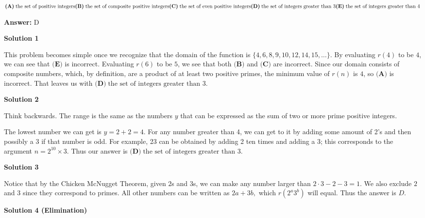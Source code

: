 \begin{enumerate}
 $\textbf{(A)}\; \text{the set of positive integers} \\ \textbf{(B)}\; \text{the set of composite positive integers} \\ \textbf{(C)}\; \text{the set of even positive integers} \\ \textbf{(D)}\; \text{the set of integers greater than 3} \\ \textbf{(E)}\; \text{the set of integers greater than 4}$

 \textbf{Answer: }D



\textbf{Solution 1}

This problem becomes simple once we recognize that the domain of the function is $\{4, 6, 8, 9, 10, 12, 14, 15, \dots\}$. By evaluating $r(4)$ to be $4$, we can see that $\textbf{(E)}$ is incorrect. Evaluating $r(6)$ to be $5$, we see that both $\textbf{(B)}$ and $\textbf{(C)}$ are incorrect. Since our domain consists of composite numbers, which, by definition, are a product of at least two positive primes, the minimum value of $r(n)$ is $4$, so $\textbf{(A)}$ is incorrect. That leaves us with $\boxed{\textbf{(D)}\; \text{the set of integers greater than }3}$.

 



\textbf{Solution 2}

Think backwards. The range is the same as the numbers $y$ that can be expressed as the sum of two or more prime positive integers.

 The lowest number we can get is $y = 2+2 = 4$. For any number greater than 4, we can get to it by adding some amount of 2's and then possibly a 3 if that number is odd. For example, 23 can be obtained by adding 2 ten times and adding a 3; this corresponds to the argument $n = 2^{10} \times 3$.  Thus our answer is $\boxed{\textbf{(D)}\; \text{the set of integers greater than }3}$.

 



\textbf{Solution 3}

Notice that by the Chicken McNugget Theorem, given $2$s and $3$s, we can make any number larger than $2\cdot3 - 2 - 3 = 1.$ We also exclude $2$ and $3$ since they correspond to primes. All other numbers can be written as $2a + 3b,$ which $r(2^a3^b)$ will equal. Thus the answer is $D.$




\textbf{Solution 4 (Elimination)}


\end{enumerate}
